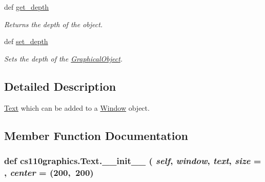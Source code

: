 \begin{DoxyCompactItemize}
def \hyperlink{classcs110graphics_1_1GraphicalObject_a6d9f5718cd0cf249e0d2842971bae17f}{get\_\-depth}
\begin{DoxyCompactList}\small\item\em Returns the depth of the object. \item\end{DoxyCompactList}\item 
def \hyperlink{classcs110graphics_1_1GraphicalObject_a20d76d4ee4419c3065d61deb6cbc6700}{set\_\-depth}
\begin{DoxyCompactList}\small\item\em Sets the depth of the \hyperlink{classcs110graphics_1_1GraphicalObject}{GraphicalObject}. \item\end{DoxyCompactList}\end{DoxyCompactItemize}


\subsection{Detailed Description}
\hyperlink{classcs110graphics_1_1Text}{Text} which can be added to a \hyperlink{classcs110graphics_1_1Window}{Window} object. 

\subsection{Member Function Documentation}
\hypertarget{classcs110graphics_1_1Text_a022ce78a2945edbd8dfe3c4498769a62}{
\subsubsection[{\_\-\_\-init\_\-\_\-}]{\setlength{\rightskip}{0pt plus 5cm}def cs110graphics.Text.\_\-\_\-init\_\-\_\- ( {\em self}, \/   {\em window}, \/   {\em text}, \/   {\em size} = {}, \/   {\em center} = {\ttfamily (200,~200})}}
\label{classcs110graphics_1_1Text_a022ce78a2945edbd8dfe3c4498769a62}

